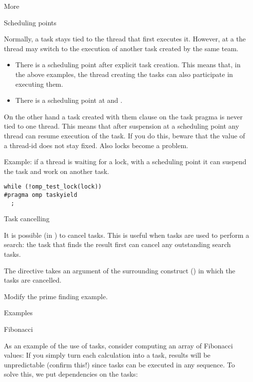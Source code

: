  {More}

 {Scheduling points}

Normally, a task stays tied to the thread that first executes it.
However, at a  the thread may
switch to the execution of another task created by the same team.
\begin{itemize}
\item There is a scheduling point after explicit task creation. This
  means that, in the above examples, the thread creating the tasks can
  also participate in executing them.
\item There is a scheduling point at  and .
\end{itemize}

On the other hand a task created with them  clause
on the task pragma is never tied to one thread. This means that after
suspension at a scheduling point any thread can resume execution of
the task.
If you do this, beware
that the value of a thread-id does not stay fixed. Also locks become a problem.

Example: if a thread is waiting for a lock, with a scheduling point it
can suspend the task and work on another task.
\begin{lstlisting}
while (!omp_test_lock(lock))
#pragma omp taskyield
  ;
\end{lstlisting}

 {Task cancelling}

It is possible (in ) to cancel
tasks. This is useful when tasks are used to perform a search: the
task that finds the result first can cancel any outstanding search
tasks.

The directive  takes an argument of the
surrounding construct () in
which the tasks are cancelled.

\begin{exercise}
  Modify the prime finding example.
\end{exercise}

 {Examples}

 {Fibonacci}

As an example of the use of tasks, consider computing an array of Fibonacci values:
%
%
If you simply turn each calculation into a task, results will be
unpredictable (confirm this!) since tasks can be executed in any sequence.
To solve this, we put dependencies on the tasks:
%

